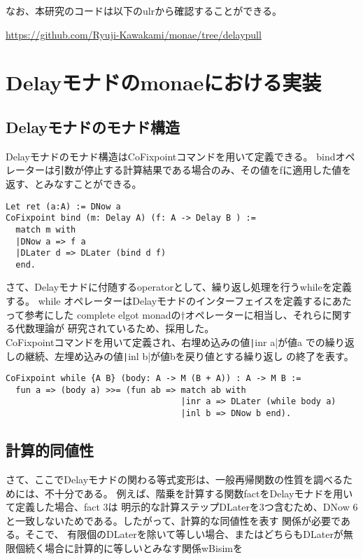 \documentclass[japanese]{jssst_ppl}
\theoremstyle{definition}
\begin{document}
なお、本研究のコードは以下のulrから確認することができる。\\

\begin{center}
  \url{https://github.com/Ryuji-Kawakami/monae/tree/delaypull}
\end{center}






\section{Delayモナドのmonaeにおける実装}


\subsection{Delayモナドのモナド構造}

Delayモナドのモナド構造はCoFixpointコマンドを用いて定義できる。
bindオペレーターは引数が停止する計算結果である場合のみ、その値をfに適用した値を返す、とみなすことができる。
\begin{verbatim}
Let ret (a:A) := DNow a
CoFixpoint bind (m: Delay A) (f: A -> Delay B ) :=
  match m with
  |DNow a => f a
  |DLater d => DLater (bind d f)
  end.
                \end{verbatim}

さて、Delayモナドに付随するoperatorとして、繰り返し処理を行うwhileを定義する。
while オペレーターはDelayモナドのインターフェイスを定義するにあたって参考にした
complete elgot monadの$\dagger$オペレーターに相当し、それらに関する代数理論が
研究されているため、採用した。\\
CoFixpointコマンドを用いて定義され、右埋め込みの値\texttt|inr a|が値a
での繰り返しの継続、左埋め込みの値\texttt|inl b|が値bを戻り値とする繰り返し
の終了を表す。

\begin{verbatim}
CoFixpoint while {A B} (body: A -> M (B + A)) : A -> M B :=
  fun a => (body a) >>= (fun ab => match ab with
                                   |inr a => DLater (while body a)
                                   |inl b => DNow b end).
\end{verbatim}




\subsection{計算的同値性}
さて、ここでDelayモナドの関わる等式変形は、一般再帰関数の性質を調べるためには、不十分である。
例えば、階乗を計算する関数factをDelayモナドを用いて定義した場合、fact 3は
明示的な計算ステップDLaterを3つ含むため、DNow 6と一致しないためである。したがって、計算的な同値性を表す
関係が必要である。そこで、
有限個のDLaterを除いて等しい場合、またはどちらもDLaterが無限個続く場合に計算的に等しいとみなす関係wBisimを
\end{document}
